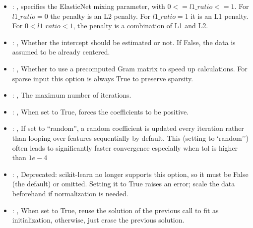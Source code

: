 \begin{itemize}
    \item {}: ,
      specifies the                                                  ElasticNet mixing parameter,
      with $0 <= l1\_ratio <= 1$.                                                  For $l1\_ratio =
      0$ the penalty is an L2 penalty.                                                  For
      $l1\_ratio = 1$ it is an L1 penalty.                                                  For $0 <
      l1\_ratio < 1$, the penalty is a combination of L1 and L2.

    \item {}: ,
      Whether the intercept should be estimated or not. If False,
      the data is assumed to be already centered.

    \item {}: ,
      Whether to use a precomputed Gram matrix to speed up calculations.
      For sparse input this option is always True to preserve sparsity.

    \item {}: ,
      The maximum number of iterations.

    \item {}: ,
      When set to True, forces the coefficients to be positive.

    \item {}: ,
      If set to ``random'', a random coefficient is updated every iteration
      rather than looping over features sequentially by default. This (setting to `random'')
      often leads to significantly faster convergence especially when tol is higher than $1e-4$

    \item {}: ,
      Deprecated: scikit-learn no longer supports this option, so it must be False (the default) or
      omitted.                                                  Setting it to True raises an error;
      scale the data beforehand if normalization is needed.

    \item {}: ,
      When set to True, reuse the solution of the previous call
      to fit as initialization, otherwise, just erase the previous solution.
  \end{itemize}


